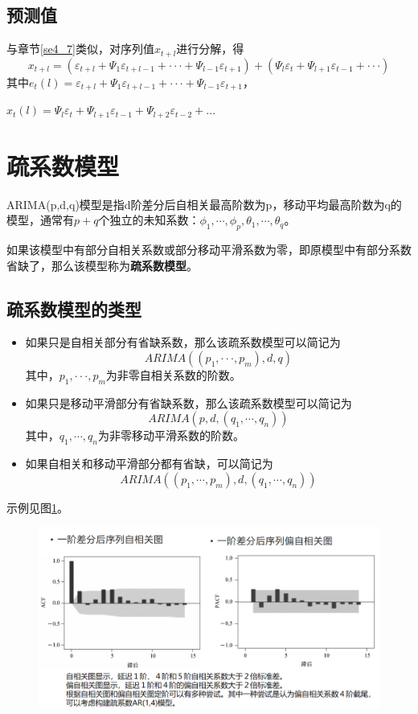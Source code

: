 \documentclass[12pt, a4paper, oneside]{ctexbook}
\begin{document}
\subsection{预测值}
与章节\ref{se4_7}类似，对序列值$x_{t+l}$进行分解，得
$$
    x_{t+l}=(\varepsilon_{t+l}+\Psi_{1}\varepsilon_{t+l-1}+\cdotp\cdotp\cdotp+\Psi_{l-1}\varepsilon_{t+1})+(\Psi_{l}\varepsilon_{t}+\Psi_{l+1}\varepsilon_{t-1}+\cdotp\cdotp\cdotp)
$$
其中$e_t(l)=\varepsilon_{t+l}+\Psi_1\varepsilon_{t+l-1}+\cdotp\cdotp\cdotp+\Psi_{l-1}\varepsilon_{t+1}$，

\noindent $\hat{x}_t(l)=\Psi_l{\varepsilon}_t+\Psi_{l+1}{\varepsilon}_{t-1}+\Psi_{l+2}{\varepsilon}_{t-2}+...$

\section{疏系数模型}
ARIMA(p,d,q)模型是指d阶差分后自相关最高阶数为p，移动平均最高阶数为q的模型，通常有$p+q$个独立的未知系数：$\phi_1,\cdots,\phi_p,\theta_1,\cdots,\theta_q$。

如果该模型中有部分自相关系数或部分移动平滑系数为零，即原模型中有部分系数省缺了，那么该模型称为\textbf{疏系数模型}。

\subsection{疏系数模型的类型}
\begin{itemize}
    \item 如果只是自相关部分有省缺系数，那么该疏系数模型可以简记为
          $$
              ARIMA((p_1,\cdotp\cdotp\cdotp,p_m),d,q)
          $$
          其中，$p_1,\cdotp\cdotp\cdotp,p_m$为非零自相关系数的阶数。
    \item 如果只是移动平滑部分有省缺系数，那么该疏系数模型可以简记为
          $$
              ARIMA(p,d,(q_1,\cdots,q_n))
          $$
          其中，$q_1,\cdots,q_n$为非零移动平滑系数的阶数。
    \item 如果自相关和移动平滑部分都有省缺，可以简记为
          $$
              ARIMA((p_1,\cdots,p_m),d,(q_1,\cdots,q_n))
          $$
\end{itemize}

示例见图\ref{im5_4}。
\begin{figure}[H]
    \centering
    \includegraphics[width = 12cm]{img/5_4.png}
    \caption{}
    \label{im5_4}
\end{figure}
\end{document}
